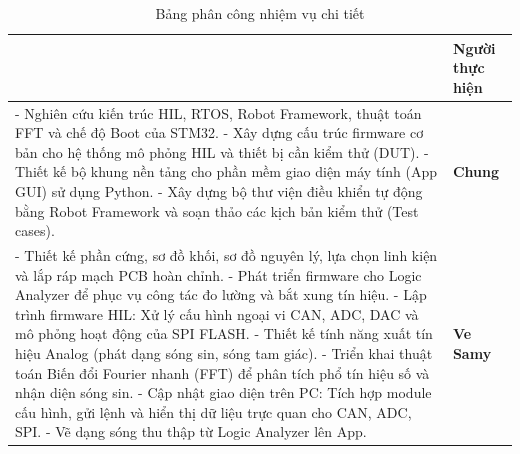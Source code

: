 \begingroup
\renewcommand{\arraystretch}{1.4} 
\begin{longtable}{|>{\raggedright\arraybackslash}p{10.7cm} |>{\centering\arraybackslash}p{2.5cm}|}
    \caption{Bảng phân công nhiệm vụ chi tiết}
    \label{tab:phan_cong} \\
    \hline
    \multicolumn{1}{|c|}{\textbf{Chi tiết công việc}} & \textbf{Người thực hiện} \\
    \hline
    \endfirsthead
    
    \hline
    \endhead
    
    \endfoot
    
    \hline
    \endlastfoot


    - Nghiên cứu kiến trúc HIL, RTOS, Robot Framework, thuật toán FFT và chế độ Boot của STM32.\newline
    - Xây dựng cấu trúc firmware cơ bản cho hệ thống mô phỏng HIL và thiết bị cần kiểm thử (DUT).\newline
    - Thiết kế bộ khung nền tảng cho phần mềm giao diện máy tính (App GUI) sử dụng Python.\newline
    - Xây dựng bộ thư viện điều khiển tự động bằng Robot Framework và soạn thảo các kịch bản kiểm thử (Test cases). & 
    \textbf{Chung} \\
    \hline
    
    - Thiết kế phần cứng, sơ đồ khối, sơ đồ nguyên lý, lựa chọn linh kiện và lắp ráp mạch PCB hoàn chỉnh.\newline
    - Phát triển firmware cho Logic Analyzer để phục vụ công tác đo lường và bắt xung tín hiệu.\newline
    - Lập trình firmware HIL: Xử lý cấu hình ngoại vi CAN, ADC, DAC và mô phỏng hoạt động của SPI FLASH.\newline
    - Thiết kế tính năng xuất tín hiệu Analog (phát dạng sóng sin, sóng tam giác).\newline
    - Triển khai thuật toán Biến đổi Fourier nhanh (FFT) để phân tích phổ tín hiệu số và nhận diện sóng sin.\newline
    - Cập nhật giao diện trên PC: Tích hợp module cấu hình, gửi lệnh và hiển thị dữ liệu trực quan cho CAN, ADC, SPI. \newline
    - Vẽ dạng sóng thu thập từ Logic Analyzer lên App. &
    \textbf{Ve Samy} \\
    \hline


\end{longtable}
